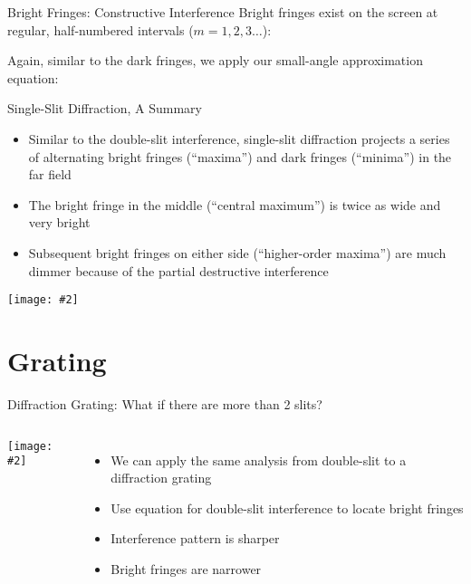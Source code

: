 \documentclass[compress,aspectratio=169]{beamer}
\newcommand{\pic}[2]{\texttt{[image: \#2]}}
\newcommand{\eq}[2]{\vspace{#1}{\LARGE\begin{displaymath}#2\end{displaymath}}}
\begin{document}
\begin{frame}{Bright Fringes: Constructive Interference}
  Bright fringes exist on the screen at regular, half-numbered intervals
  ($m=1,2,3\ldots$):

  \eq{-.2in}{
    \boxed{\left(m+\frac{1}{2}\right)\lambda=W\sin\theta_m}
  }
  
  \vspace{-.1in}Again, similar to the dark fringes, we apply our small-angle
  approximation equation:

  \eq{-.2in}{
    \boxed{y_m=\left(m+\frac{1}{2}\right)\frac{\lambda L}{W}}
  }
\end{frame}



\begin{frame}{Single-Slit Diffraction, A Summary}
  \begin{itemize}
  \item Similar to the double-slit interference, single-slit diffraction
    projects a series of alternating bright fringes (``maxima'') and dark
    fringes (``minima'') in the far field
  \item The bright fringe in the middle (``central maximum'') is twice as wide
    and very bright
  \item Subsequent bright fringes on either side (``higher-order maxima'') are
    much dimmer because of the partial destructive interference
  \end{itemize}
  \begin{center}
    \pic{.65}{graphics/Single_Slit_Diffraction.png}
  \end{center}
\end{frame}



\section{Grating}

\begin{frame}{Diffraction Grating: What if there are more than 2 slits?}
  \begin{columns}
    \pic{1.1}{graphics/grating1.png}
    
    \begin{itemize}
    \item We can apply the same analysis from double-slit to a diffraction
      grating
    \item Use equation for double-slit interference to locate bright fringes
      
      \eq{-.2in}{
        n\lambda=d\sin\theta_n
      }
    \item Interference pattern is sharper
    \item Bright fringes are narrower
    \end{itemize}
  \end{columns}
\end{frame}
\end{document}
